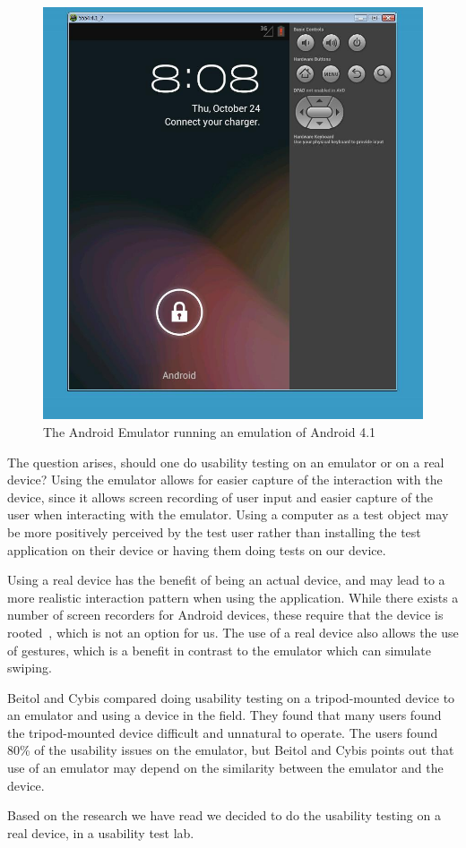 \begin{figure}
\begin{center}
\includegraphics[scale=0.4]{Pictures/app-screenshots/androidemulator.png}
\end{center}
\caption{The Android Emulator running an emulation of Android 4.1}
\label{fig:androidemulator}
\end{figure}

The question arises, should one do usability testing on an emulator or on a real device?
Using the emulator allows for easier capture of the interaction with the device, since it allows screen recording of user input and easier capture of the user when interacting with the emulator. Using a computer as a test object may be more positively perceived by the test user rather than installing the test application on their device or having them doing tests on our device. 

Using a real device has the benefit of being an actual device, and may lead to a more realistic interaction pattern when using the application. While there exists a number of screen recorders for Android devices, these require that the device is rooted , which is not an option for us. 
The use of a real device also allows the use of gestures, which is a benefit in contrast to the emulator which can simulate swiping. 


Beitol and Cybis \cite{betiol2005usability} compared doing usability testing on a tripod-mounted device to an emulator and using a device in the field. They found that many users found the tripod-mounted device difficult and unnatural to operate. The users found 80\% of the usability issues on the emulator, but Beitol and Cybis points out that use of an emulator may depend on the similarity between the emulator and the device. 

Based on the research we have read we decided to do the usability testing on a real device, in a usability test lab.
